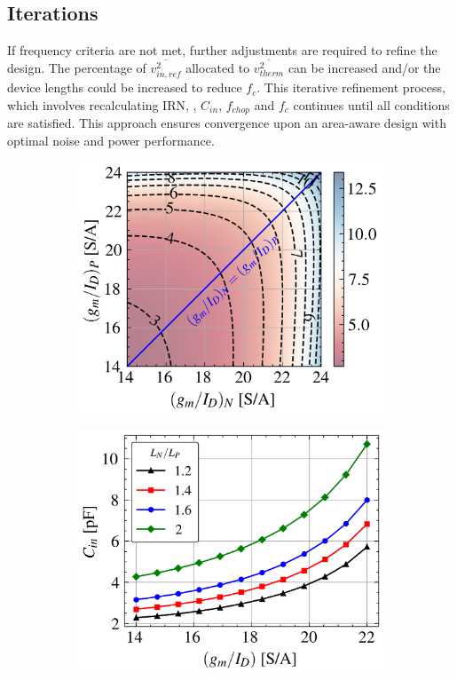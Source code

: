 \subsection{Iterations}
If frequency criteria are not met, further adjustments are required to refine the design. The percentage of $\overline{v_{in,ref}^2}$ allocated to $\overline{v_{therm}^2}$ can be increased and/or the device lengths could be increased to reduce $f_{c}$. This iterative refinement process, which involves recalculating IRN, \gmID, $C_{in}$, $f_{chop}$ and $f_c$ continues until all conditions are satisfied. This approach ensures convergence upon an area-aware design with optimal noise and power performance.

\begin{figure}[!h]
        \centering
        \begin{subfigure}[c]{0.49\linewidth}
            \centering
            \includegraphics[width=\linewidth]{img/CIN_CONTOUR.png}
            \caption[]%
            {{\small }}
            \label{fig:Cin Contour}
        \end{subfigure}
        \hfill
        \begin{subfigure}[c]{0.49\linewidth}  
            \centering 
            \includegraphics[width=\linewidth]{img/CIN-GMID.png}

\end{subfigure}
\end{figure}
